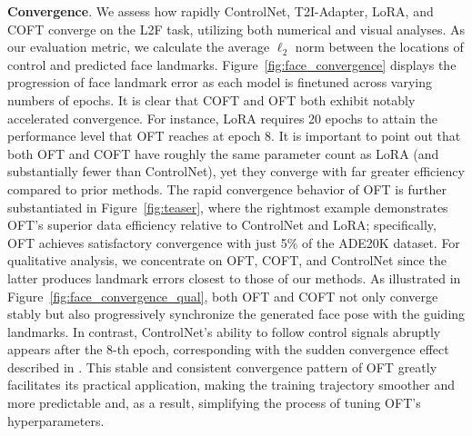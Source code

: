 \textbf{Convergence}. We assess how rapidly ControlNet, T2I-Adapter, LoRA, and COFT converge on the L2F task, utilizing both numerical and visual analyses. As our evaluation metric, we calculate the average $\ell_2$ norm between the locations of control and predicted face landmarks. Figure~\ref{fig:face_convergence} displays the progression of face landmark error as each model is finetuned across varying numbers of epochs. It is clear that COFT and OFT both exhibit notably accelerated convergence. For instance, LoRA requires 20 epochs to attain the performance level that OFT reaches at epoch 8. It is important to point out that both OFT and COFT have roughly the same parameter count as LoRA (and substantially fewer than ControlNet), yet they converge with far greater efficiency compared to prior methods. The rapid convergence behavior of OFT is further substantiated in Figure~\ref{fig:teaser}, where the rightmost example demonstrates OFT’s superior data efficiency relative to ControlNet and LoRA; specifically, OFT achieves satisfactory convergence with just 5\% of the ADE20K dataset. For qualitative analysis, we concentrate on OFT, COFT, and ControlNet since the latter produces landmark errors closest to those of our methods. As illustrated in Figure~\ref{fig:face_convergence_qual}, both OFT and COFT not only converge stably but also progressively synchronize the generated face pose with the guiding landmarks. In contrast, ControlNet's ability to follow control signals abruptly appears after the 8-th epoch, corresponding with the sudden convergence effect described in \cite{zhang2023adding}. This stable and consistent convergence pattern of OFT greatly facilitates its practical application, making the training trajectory smoother and more predictable and, as a result, simplifying the process of tuning OFT's hyperparameters.

